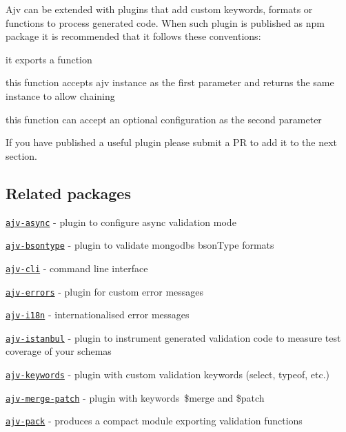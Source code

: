 Ajv can be extended with plugins that add custom keywords, formats or functions to process generated code. When such plugin is published as npm package it is recommended that it follows these conventions\+:


\begin{DoxyItemize}
\item it exports a function
\item this function accepts ajv instance as the first parameter and returns the same instance to allow chaining
\item this function can accept an optional configuration as the second parameter
\end{DoxyItemize}

If you have published a useful plugin please submit a PR to add it to the next section.

\subsection*{Related packages}


\begin{DoxyItemize}
\item \href{https://github.com/epoberezkin/ajv-async}{\tt ajv-\/async} -\/ plugin to configure async validation mode
\item \href{https://github.com/BoLaMN/ajv-bsontype}{\tt ajv-\/bsontype} -\/ plugin to validate mongodb\textquotesingle{}s bson\+Type formats
\item \href{https://github.com/jessedc/ajv-cli}{\tt ajv-\/cli} -\/ command line interface
\item \href{https://github.com/epoberezkin/ajv-errors}{\tt ajv-\/errors} -\/ plugin for custom error messages
\item \href{https://github.com/epoberezkin/ajv-i18n}{\tt ajv-\/i18n} -\/ internationalised error messages
\item \href{https://github.com/epoberezkin/ajv-istanbul}{\tt ajv-\/istanbul} -\/ plugin to instrument generated validation code to measure test coverage of your schemas
\item \href{https://github.com/epoberezkin/ajv-keywords}{\tt ajv-\/keywords} -\/ plugin with custom validation keywords (select, typeof, etc.)
\item \href{https://github.com/epoberezkin/ajv-merge-patch}{\tt ajv-\/merge-\/patch} -\/ plugin with keywords \$merge and \$patch
\item \href{https://github.com/epoberezkin/ajv-pack}{\tt ajv-\/pack} -\/ produces a compact module exporting validation functions
\end{DoxyItemize}

